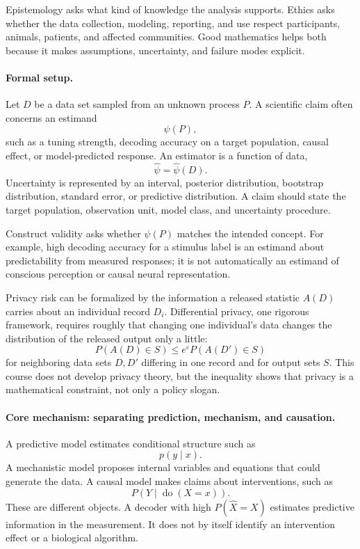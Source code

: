 Epistemology asks what kind of knowledge the analysis supports. Ethics asks whether the data collection, modeling, reporting, and use respect participants, animals, patients, and affected communities. Good mathematics helps both because it makes assumptions, uncertainty, and failure modes explicit.

\paragraph{Formal setup.}
Let \(D\) be a data set sampled from an unknown process \(P\). A scientific claim often concerns an estimand
\[
\psi(P),
\]
such as a tuning strength, decoding accuracy on a target population, causal effect, or model-predicted response. An estimator is a function of data,
\[
\widehat\psi=\widehat\psi(D).
\]
Uncertainty is represented by an interval, posterior distribution, bootstrap distribution, standard error, or predictive distribution. A claim should state the target population, observation unit, model class, and uncertainty procedure.

Construct validity asks whether \(\psi(P)\) matches the intended concept. For example, high decoding accuracy for a stimulus label is an estimand about predictability from measured responses; it is not automatically an estimand of conscious perception or causal neural representation.

Privacy risk can be formalized by the information a released statistic \(A(D)\) carries about an individual record \(D_i\). Differential privacy, one rigorous framework, requires roughly that changing one individual's data changes the distribution of the released output only a little:
\[
P(A(D)\in S)\leq e^\varepsilon P(A(D')\in S)
\]
for neighboring data sets \(D,D'\) differing in one record and for output sets \(S\). This course does not develop privacy theory, but the inequality shows that privacy is a mathematical constraint, not only a policy slogan.

\paragraph{Core mechanism: separating prediction, mechanism, and causation.}
A predictive model estimates conditional structure such as
\[
p(y\mid x).
\]
A mechanistic model proposes internal variables and equations that could generate the data. A causal model makes claims about interventions, such as
\[
P(Y\mid \operatorname{do}(X=x)).
\]
These are different objects. A decoder with high \(P(\widehat X=X)\) estimates predictive information in the measurement. It does not by itself identify an intervention effect or a biological algorithm.

